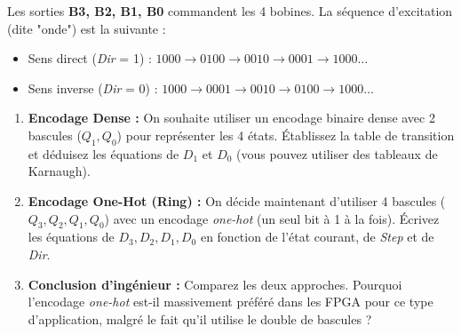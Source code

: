 \documentclass[a4paper,11pt]{article}
\begin{document}
Les sorties \textbf{B3, B2, B1, B0} commandent les 4 bobines. La séquence d'excitation (dite "onde") est la suivante :
\begin{itemize}
\item Sens direct (\textit{Dir} = 1) : $1000 \to 0100 \to 0010 \to 0001 \to 1000 \dots$
\item Sens inverse (\textit{Dir} = 0) : $1000 \to 0001 \to 0010 \to 0100 \to 1000 \dots$
\end{itemize}

\begin{enumerate}
\item \textbf{Encodage Dense :} On souhaite utiliser un encodage binaire dense avec 2 bascules ($Q_1, Q_0$) pour représenter les 4 états.
Établissez la table de transition et déduisez les équations de $D_1$ et $D_0$ (vous pouvez utiliser des tableaux de Karnaugh).
\item \textbf{Encodage One-Hot (Ring) :} On décide maintenant d'utiliser 4 bascules ($Q_3, Q_2, Q_1, Q_0$) avec un encodage \textit{one-hot} (un seul bit à 1 à la fois).
Écrivez les équations de $D_3, D_2, D_1, D_0$ en fonction de l'état courant, de \textit{Step} et de \textit{Dir}.
\item \textbf{Conclusion d'ingénieur :} Comparez les deux approches. Pourquoi l'encodage \textit{one-hot} est-il massivement préféré dans les FPGA pour ce type d'application, malgré le fait qu'il utilise le double de bascules ?
\end{enumerate}
\end{document}
